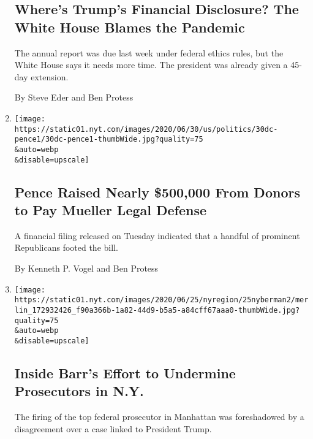 \begin{enumerate}
  \hypertarget{wheres-trumps-financial-disclosure-the-white-house-blames-the-pandemic}{%
  \subsection{Where's Trump's Financial Disclosure? The White House
  Blames the
  Pandemic}\label{wheres-trumps-financial-disclosure-the-white-house-blames-the-pandemic}}

  The annual report was due last week under federal ethics rules, but
  the White House says it needs more time. The president was already
  given a 45-day extension.

  By Steve Eder and Ben Protess
\item
  \href{/2020/06/30/us/politics/pence-mueller.html}{}

  \texttt{[image: https://static01.nyt.com/images/2020/06/30/us/politics/30dc-pence1/30dc-pence1-thumbWide.jpg?quality=75\\\&auto=webp\\\&disable=upscale]}

  \hypertarget{pence-raised-nearly-500000-from-donors-to-pay-mueller-legal-defense}{%
  \subsection{Pence Raised Nearly \$500,000 From Donors to Pay Mueller
  Legal
  Defense}\label{pence-raised-nearly-500000-from-donors-to-pay-mueller-legal-defense}}

  A financial filing released on Tuesday indicated that a handful of
  prominent Republicans footed the bill.

  By Kenneth P. Vogel and Ben Protess
\item
  \href{/2020/06/25/nyregion/geoffrey-berman-william-barr-michael-cohen.html}{}

  \texttt{[image: https://static01.nyt.com/images/2020/06/25/nyregion/25nyberman2/merlin\_172932426\_f90a366b-1a82-44d9-b5a5-a84cff67aaa0-thumbWide.jpg?quality=75\\\&auto=webp\\\&disable=upscale]}

  \hypertarget{inside-barrs-effort-to-undermine-prosecutors-in-ny}{%
  \subsection{Inside Barr's Effort to Undermine Prosecutors in
  N.Y.}\label{inside-barrs-effort-to-undermine-prosecutors-in-ny}}

  The firing of the top federal prosecutor in Manhattan was foreshadowed
  by a disagreement over a case linked to President Trump.


\end{enumerate}
